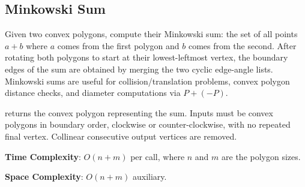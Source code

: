 \subsection{Minkowski Sum}
\label{sec:7.4.3}
Given two convex polygons, compute their Minkowski sum: the set of all points $a + b$ where $a$ comes from the first polygon and $b$ comes from the second. After rotating both polygons to start at their lowest-leftmost vertex, the boundary edges of the sum are obtained by merging the two cyclic edge-angle lists. Minkowski sums are useful for collision/translation problems, convex polygon distance checks, and diameter computations via $P + (-P)$.

\begin{compactitem}
  \item {} returns the convex polygon representing the sum. Inputs must be convex polygons in boundary order, clockwise or counter-clockwise, with no repeated final vertex. Collinear consecutive output vertices are removed.
\end{compactitem}

\textbf{Time Complexity}: $O(n + m)$ per call, where $n$ and $m$ are the polygon sizes.

\textbf{Space Complexity}: $O(n + m)$ auxiliary.

